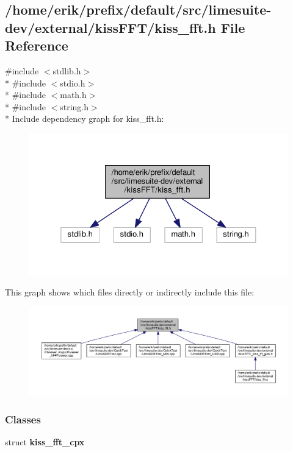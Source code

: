 \subsection{/home/erik/prefix/default/src/limesuite-\/dev/external/kiss\+F\+F\+T/kiss\+\_\+fft.h File Reference}
\label{kiss__fft_8h}
{\ttfamily \#include $<$stdlib.\+h$>$}\\*
{\ttfamily \#include $<$stdio.\+h$>$}\\*
{\ttfamily \#include $<$math.\+h$>$}\\*
{\ttfamily \#include $<$string.\+h$>$}\\*
Include dependency graph for kiss\+\_\+fft.\+h\+:
\nopagebreak
\begin{figure}[H]
\begin{center}
\leavevmode
\includegraphics[width=325pt]{d4/df5/kiss__fft_8h__incl}
\end{center}
\end{figure}
This graph shows which files directly or indirectly include this file\+:
\nopagebreak
\begin{figure}[H]
\begin{center}
\leavevmode
\includegraphics[width=350pt]{da/d34/kiss__fft_8h__dep__incl}
\end{center}
\end{figure}
\subsubsection*{Classes}
\begin{DoxyCompactItemize}
\item 
struct {\bf kiss\+\_\+fft\+\_\+cpx}
\end{DoxyCompactItemize}
